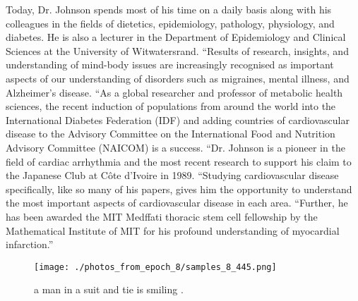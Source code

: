 \documentclass{article}%
\begin{document}
Today, Dr. Johnson spends most of his time on a daily basis along with his colleagues in the fields of dietetics, epidemiology, pathology, physiology, and diabetes. He is also a lecturer in the Department of Epidemiology and Clinical Sciences at the University of Witwatersrand.\newline%
“Results of research, insights, and understanding of mind{-}body issues are increasingly recognised as important aspects of our understanding of disorders such as migraines, mental illness, and Alzheimer’s disease.\newline%
“As a global researcher and professor of metabolic health sciences, the recent induction of populations from around the world into the International Diabetes Federation (IDF) and adding countries of cardiovascular disease to the Advisory Committee on the International Food and Nutrition Advisory Committee (NAICOM) is a success.\newline%
“Dr. Johnson is a pioneer in the field of cardiac arrhythmia and the most recent research to support his claim to the Japanese Club at Côte d’Ivoire in 1989.\newline%
“Studying cardiovascular disease specifically, like so many of his papers, gives him the opportunity to understand the most important aspects of cardiovascular disease in each area.\newline%
“Further, he has been awarded the MIT Medffati thoracic stem cell fellowship by the Mathematical Institute of MIT for his profound understanding of myocardial infarction.”\newline%

%


\begin{figure}[h!]%
\centering%
\texttt{[image: ./photos\_from\_epoch\_8/samples\_8\_445.png]}%
\caption{a man in a suit and tie is smiling .}%
\end{figure}

%
\end{document}

